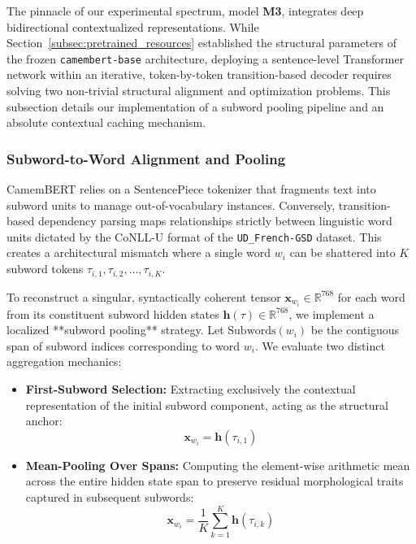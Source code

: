 \documentclass[12pt,a4paper]{article}
\begin{document}
The pinnacle of our experimental spectrum, model \textbf{M3}, integrates deep bidirectional contextualized representations. While Section~\ref{subsec:pretrained_resources} established the structural parameters of the frozen \texttt{camembert-base} architecture, deploying a sentence-level Transformer network within an iterative, token-by-token transition-based decoder requires solving two non-trivial structural alignment and optimization problems. This subsection details our implementation of a subword pooling pipeline and an absolute contextual caching mechanism.

\subsubsection{Subword-to-Word Alignment and Pooling}
CamemBERT relies on a SentencePiece tokenizer that fragments text into subword units to manage out-of-vocabulary instances. Conversely, transition-based dependency parsing maps relationships strictly between linguistic word units dictated by the CoNLL-U format of the \texttt{UD_French-GSD} dataset. This creates a architectural mismatch where a single word $w_i$ can be shattered into $K$ subword tokens $\tau_{i,1}, \tau_{i,2}, \dots, \tau_{i,K}$.

To reconstruct a singular, syntactically coherent tensor $\mathbf{x}_{w_i} \in \mathbb{R}^{768}$ for each word from its constituent subword hidden states $\mathbf{h}(\tau) \in \mathbb{R}^{768}$, we implement a localized **subword pooling** strategy. Let $\text{Subwords}(w_i)$ be the contiguous span of subword indices corresponding to word $w_i$. We evaluate two distinct aggregation mechanics:

\begin{itemize}
    \item \textbf{First-Subword Selection:} Extracting exclusively the contextual representation of the initial subword component, acting as the structural anchor:
    \begin{equation}
        \mathbf{x}_{w_i} = \mathbf{h}\left(\tau_{i,1}\right)
    \end{equation}
    
    \item \textbf{Mean-Pooling Over Spans:} Computing the element-wise arithmetic mean across the entire hidden state span to preserve residual morphological traits captured in subsequent subwords:
    \begin{equation}
        \mathbf{x}_{w_i} = \frac{1}{K} \sum_{k=1}^{K} \mathbf{h}\left(\tau_{i,k}\right)
    \end{equation}
\end{itemize}
\end{document}

